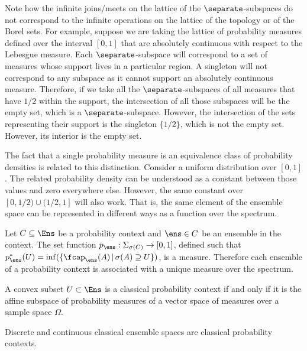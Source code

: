	\begin{remark}
		Note how the infinite joins/meets on the lattice of the $\separate$-subspaces do not correspond to the infinite operations on the lattice of the topology or of the Borel sets. For example, suppose we are taking the lattice of probability measures defined over the interval $[0,1]$ that are absolutely continuous with respect to the Lebesgue measure. Each $\separate$-subspace will correspond to a set of measures whose support lives in a particular region. A singleton will not correspond to any subspace as it cannot support an absolutely continuous measure. Therefore, if we take all the $\separate$-subspaces of all measures that have $1/2$ within the support, the intersection of all those subspaces will be the empty set, which is a $\separate$-subspace. However, the intersection of the sets representing their support is the singleton $\{1/2\}$, which is not the empty set. However, its interior is the empty set.
		
		The fact that a single probability measure is an equivalence class of probability densities is related to this distinction. Consider a uniform distribution over $[0,1]$. The related probability density can be understood as a constant between those values and zero everywhere else. However, the same constant over $[0,1/2) \cup (1/2,1]$ will also work. That is, the same element of the ensemble space can be represented in different ways as a function over the spectrum.
	\end{remark}

\begin{conj}
	Let $C \subseteq \Ens$ be a probability context and $\ens \in C$ be an ensemble in the context. The set function $p_{\ens} : \Sigma_{\sigma(C)} \to[0,1]$, defined such that $p^*_{\ens}(U) = \inf(\{ \fcap_{\ens}(A) \, | \, \sigma(A) \supseteq U \})$, is a measure. Therefore each ensemble of a probability context is associated with a unique measure over the spectrum.
\end{conj}

\begin{conj}
	A convex subset $U \subset \Ens$ is a classical probability context if and only if it is the affine subspace of probability measures of a vector space of measures over a sample space $\Omega$.
\end{conj}

\begin{conj}
	Discrete and continuous classical ensemble spaces are classical probability contexts.
\end{conj}

